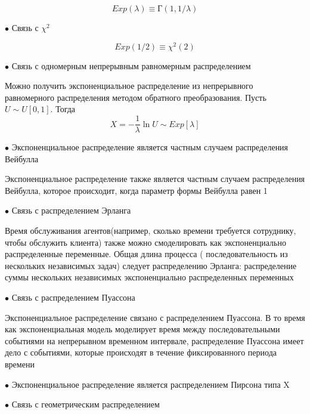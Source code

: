 \documentclass[a4paper,12pt, oneside]{book}
\begin{document}
{{$$
Exp(\lambda) \equiv Г(1, 1/\lambda)
$$

\vspace{5mm}
{\sf$\bullet$ Связь с $\chi^2$}
\vspace{5mm}

$$
Exp(1/2) \equiv \chi^2(2)
$$

\vspace{5mm}
{\sf$\bullet$ Связь с одномерным непрерывным равномерным распределением}
\vspace{5mm}

Можно получить экспоненциальное распределение из  непрерывного равномерного распределения методом обратного преобразования. Пусть $U \sim U[0,1]$. Тогда
$$
X=-\frac{1}{\lambda}\ln U \sim Exp[\lambda]
$$

\vspace{5mm}
{\sf$\bullet$ Экспоненциальное распределение является частным случаем распределения Вейбулла}
\vspace{5mm}

Экспоненциальное распределение также является частным случаем распределения Вейбулла, которое происходит, когда параметр формы Вейбулла равен 1
 
\vspace{5mm}
{\sf$\bullet$ Связь с распределением Эрланга}
\vspace{5mm}

Время обслуживания агентов(например, сколько времени требуется сотруднику, чтобы обслужить клиента) также можно смоделировать как экспоненциально распределенные переменные.
Общая длина процесса ( последовательность из нескольких независимых задач) следует распределению Эрланга: распределение суммы нескольких независимых экспоненциально распределенных переменных

\vspace{5mm}
{\sf$\bullet$ Связь с распределением Пуассона}
\vspace{5mm}

Экспоненциальное распределение связано с распределением Пуассона. В то время как экспоненциальная модель моделирует время между последовательными событиями на непрерывном временном интервале, распределение Пуассона имеет дело с событиями, которые происходят в течение фиксированного периода времени

\vspace{5mm}
{\sf$\bullet$ Экспоненциальное распределение является распределением Пирсона типа X}
\vspace{5mm}

\vspace{5mm}
{\sf$\bullet$ Связь с геометрическим распределением}
\vspace{5mm}

}}
\end{document}
